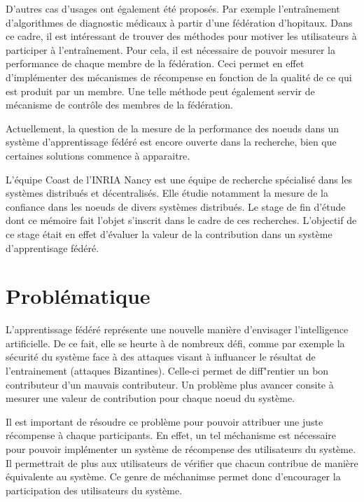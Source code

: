 \documentclass[stage3a]{tnreport} %
\begin{document}
D'autres cas d'usages ont également été proposés. Par exemple l'entraînement d'algorithmes de diagnostic médicaux à partir d'une fédération d'hopitaux. Dans ce cadre, il est intéressant de trouver des méthodes pour motiver les utilisateurs à participer à l'entraînement. Pour cela, il est nécessaire de pouvoir mesurer la performance de chaque membre de la fédération. Ceci permet en effet d'implémenter des mécanismes de récompense en fonction de la qualité de ce qui est produit par un membre. Une telle méthode peut également servir de mécanisme de contrôle des membres de la fédération. 

Actuellement, la question de la mesure de la performance des noeuds dans un système d'apprentissage fédéré est encore ouverte dans la recherche, bien que certaines solutions commence à apparaitre. 

L'équipe Coast de l'INRIA Nancy est une équipe de recherche spécialisé dans les systèmes distribués et décentralisés. Elle étudie notamment la mesure de la confiance dans les noeuds de divers systèmes distribués. Le stage de fin d'étude dont ce mémoire fait l'objet s'inscrit dans le cadre de ces recherches. L'objectif de ce stage était en effet d'évaluer la valeur de la contribution dans un système d'apprentisage fédéré.


\cleardoublepage


\chapter{Problématique}

L'apprentissage fédéré représente une nouvelle manière d'envisager l'intelligence artificielle. De ce fait, elle se heurte à de nombreux défi, comme par exemple la sécurité du système face à des attaques visant à influancer le résultat de l'entrainement (attaques Bizantines). Celle-ci permet de diff"rentier un bon contributeur d'un mauvais contributeur. Un problème plus avancer consite à mesurer une valeur de contribution pour chaque noeud du système.

Il est important de résoudre ce problème pour pouvoir attribuer une juste récompense à chaque participants. En effet, un tel méchanisme est nécessaire pour pouvoir implémenter un système de récompense des utilisateurs du système. Il permettrait de plus aux utilisateurs de vérifier que chacun contribue de manière équivalente au système. Ce genre de méchanimse permet donc d'encourager la participation des utilisateurs du système. 
\end{document}
